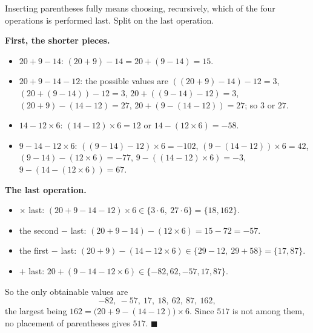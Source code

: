 Inserting parentheses fully means choosing, recursively, which of the four operations is performed last. Split on the last operation.

\textbf{First, the shorter pieces.}
\begin{itemize}
\item $20+9-14$: $(20+9)-14=20+(9-14)=15$.
\item $20+9-14-12$: the possible values are $((20+9)-14)-12=3$, $(20+(9-14))-12=3$, $20+((9-14)-12)=3$, $(20+9)-(14-12)=27$, $20+(9-(14-12))=27$; so $3$ or $27$.
\item $14-12\times6$: $(14-12)\times6=12$ or $14-(12\times6)=-58$.
\item $9-14-12\times6$: $((9-14)-12)\times6=-102$, $(9-(14-12))\times6=42$, $(9-14)-(12\times6)=-77$, $9-((14-12)\times6)=-3$, $9-(14-(12\times6))=67$.
\end{itemize}

\textbf{The last operation.}
\begin{itemize}
\item $\times$ last: $(20+9-14-12)\times6\in\{3\cdot6,\ 27\cdot6\}=\{18,162\}$.
\item the second $-$ last: $(20+9-14)-(12\times6)=15-72=-57$.
\item the first $-$ last: $(20+9)-(14-12\times6)\in\{29-12,\ 29+58\}=\{17,87\}$.
\item $+$ last: $20+(9-14-12\times6)\in\{-82,62,-57,17,87\}$.
\end{itemize}

So the only obtainable values are
\[
-82,\ -57,\ 17,\ 18,\ 62,\ 87,\ 162 ,
\]
the largest being $\boxed{162}=\bigl(20+9-(14-12)\bigr)\times6$. Since $517$ is not among them, no placement of parentheses gives $517$. $\blacksquare$
